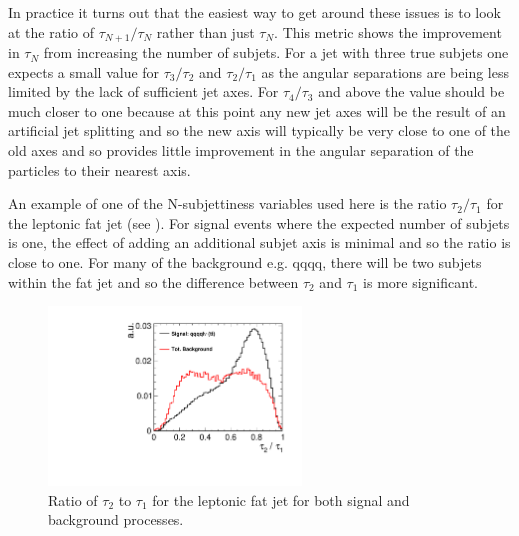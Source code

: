 In practice it turns out that the easiest way to get around these issues is to look at the ratio of $\tau_{N+1}/\tau_N$ rather than just $\tau_N$. This metric shows the improvement in $\tau_N$ from increasing the number of subjets. For a jet with three true subjets one expects a small value for $\tau_{3}/\tau_2$ and $\tau_{2}/\tau_1$ as the angular separations are being less limited by the lack of sufficient jet axes. For $\tau_{4}/\tau_3$ and above the value should be much closer to one because at this point any new jet axes will be the result of an artificial jet splitting and so the new axis will typically be very close to one of the old axes and so provides little improvement in the angular separation of the particles to their nearest axis.

An example of one of the N-subjettiness variables used here is the ratio $\tau_{2}/\tau_1$ for the leptonic fat jet (see ). For signal events where the expected number of subjets is one, the effect of adding an additional subjet axis is minimal and so the ratio is close to one. For many of the background e.g. qqqq, there will be two subjets within the fat jet and so the difference between $\tau_{2}$ and $\tau_1$ is more significant.

\begin{figure}
  \centering
  \includegraphics[width=0.6\textwidth]{TopAnalysis/figures/NSubJettiness.pdf}
  \caption[Ratio of $\tau_{2}$ to $\tau_1$ for the leptonic fat jet for both signal and background processes]{Ratio of $\tau_{2}$ to $\tau_1$ for the leptonic fat jet for both signal and background processes.}
  \label{fig:lepfatjetsubjet}
\end{figure}

  
